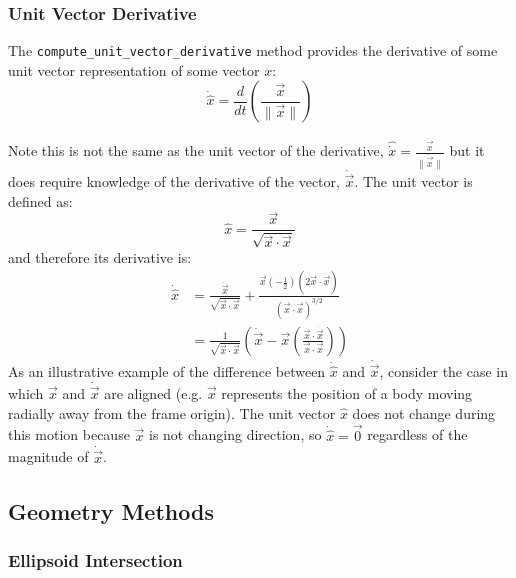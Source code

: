 \documentclass[11pt,fleqn]{report}
\begin{document}
\subsubsection{Unit Vector Derivative}
The \texttt{compute\_unit\_vector\_derivative} method provides the derivative 
of some unit vector representation of
some vector $x$:
\begin{equation*}
 \dot {\hat{x}} = \frac{d}{dt} \left( \frac{ \vec x}
 { \rVert \vec x \rVert}
 \right)
\end{equation*}

Note this is not the same as the unit vector of the derivative,
$\hat {\dot{x}} = \frac{ \dot{\vec{x}}}
 { \rVert \dot{\vec{x}} \rVert}$
but it does require
knowledge of the derivative of the vector, $\dot{\vec x}$.
The unit vector is defined as:
\begin{equation*}
 \hat{x} = \frac{\vec{x}}{\sqrt{ \vec{x} \cdot \vec x}}
\end{equation*}
and therefore its derivative is:
\begin{equation*}
\begin{split}
\dot{\hat{x}} & = \frac{\dot{\vec{x}}}{\sqrt{ \vec x \cdot \vec x}} +
\frac{\vec x \left(-\frac{1}{2} \right)
\left(2 \vec{x} \cdot \dot{\vec{x}}\right)}
 {(\vec{x} \cdot \vec x)^{3/2}} \\
& = \frac{1}{\sqrt{ \vec x \cdot \vec x}}
\left(\dot{\vec x} - \vec x
 \left(\frac{ \vec x \cdot \dot{\vec x}}
{\vec x \cdot \vec x}
 \right)
\right)
\end{split}
\end{equation*}
As an illustrative example of the difference between $\dot{\hat x}$ and
$\dot{\vec x}$, consider the case in which $\vec x$ and $\dot{\vec x}$ are
aligned (e.g. $\vec x$ represents the position of a body moving radially
away from the frame origin). The
unit vector $\hat x$ does not change during this motion because $\vec x$
is not changing direction, so $\dot{\hat x} = \vec 0$ regardless of the
magnitude of $\dot{\vec x}$.

\subsection{Geometry Methods}
\subsubsection{Ellipsoid Intersection}
\end{document}
